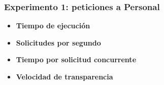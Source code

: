 \subsubsection{Experimento 1: peticiones a Personal}

\begin{itemize}
	\item \textbf{Tiempo de ejecución}
	\item \textbf{Solicitudes por segundo}
	\item \textbf{Tiempo por solicitud concurrente}
	\item \textbf{Velocidad de transparencia}
\end{itemize}